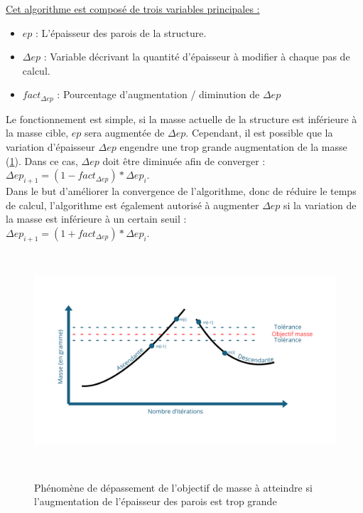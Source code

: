 \documentclass[a4paper]{article}
\begin{document}
	\underline{Cet algorithme est composé de trois variables principales :}
	
	\begin{itemize}
		\item $ep$ : L’épaisseur des parois de la structure.
		\item $\Delta ep$ : Variable décrivant la quantité d’épaisseur à modifier à chaque pas de calcul.
		\item $fact_{\Delta ep}$ : Pourcentage d’augmentation / diminution de $\Delta ep$
	\end{itemize}

	Le fonctionnement est simple, si la masse actuelle de la structure est inférieure à la masse cible, $ep$ sera augmentée de $\Delta ep$. Cependant, il est possible que la variation d’épaisseur $\Delta ep$ engendre une trop grande augmentation de la masse (\ref{trop_grande_aug_ep}). Dans ce cas, $\Delta ep$ doit être diminuée afin de converger : $\Delta ep_{i+1} = (1 - fact_{\Delta ep}) * \Delta ep_{i}$.\\
	
	Dans le but d’améliorer la convergence de l’algorithme, donc de réduire le temps de calcul, l’algorithme est également autorisé à augmenter $\Delta ep$ si la variation de la masse est inférieure à un certain seuil :\\
	$\Delta ep_{i+1} = (1 + fact_{\Delta ep}) * \Delta ep_{i}$.
	
	\begin{figure}[H]
		\centering
		\includegraphics[height=8cm]{Images/4/tolerance.pdf}\\
		\caption{Phénomène de dépassement de l'objectif de masse à atteindre si l'augmentation de l'épaisseur des parois est trop grande}
		\label{trop_grande_aug_ep}
	\end{figure}
	\newpage
			
\end{document}
